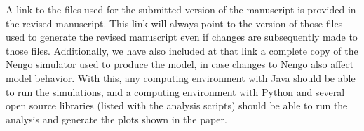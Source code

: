 \documentclass[11pt,paper=letter]{scrartcl}
\begin{document}
A link to the files used
for the submitted version of the manuscript
is provided in the revised manuscript.
This link will always point to the
version of those files
used to generate the revised manuscript
even if changes are subsequently
made to those files.
Additionally, we have also included
at that link a complete copy
of the Nengo simulator
used to produce the model,
in case changes to Nengo also
affect model behavior.
With this, any computing environment
with Java should be able to
run the simulations,
and a computing environment
with Python and several open source libraries
(listed with the analysis scripts)
should be able to run
the analysis and generate
the plots shown in the paper.



\end{document}
